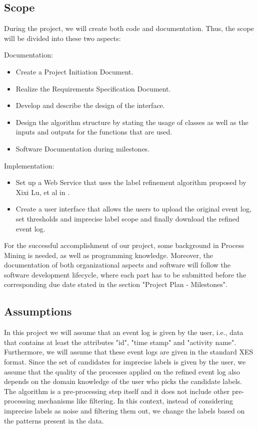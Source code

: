 \documentclass[notitlepage]{article}
\begin{document}
\begin{flushleft}
\subsection{Scope}

During the project, we will create both code and documentation. Thus, the scope will be divided into these two aspects:

Documentation: 
\begin{itemize}
	\item Create a Project Initiation Document. 
	\item Realize the Requirements Specification Document.
	\item Develop and describe the design of the interface. 
	\item Design the algorithm structure by stating the usage of classes as well as the inputs and outputs for the functions that are used.
	\item Software Documentation during milestones.
\end{itemize} 


Implementation:
\begin{itemize}
	\item Set up a Web Service that uses the label refinement algorithm proposed by Xixi Lu, et al in \cite{paper}.
	\item Create a user interface that allows the users to upload the original event log, set thresholds and imprecise label scope and finally download the refined event log.
\end{itemize}

For the successful accomplishment of our project, some background in Process Mining is needed, as well as programming knowledge.
Moreover, the documentation of both organizational aspects and software will follow the software development lifecycle, where each part has to be submitted before the corresponding due date stated in the section "Project Plan - Milestones".


\subsection{Assumptions}

In this project we will assume that an event log is given by the user, i.e., data that contains at least the attributes "id", "time stamp" and "activity name". Furthermore, we will assume that these event logs are given in the standard XES format.
Since the set of candidates for imprecise labels is given by the user, we assume that the quality of the processes applied on the refined event log also depends on the domain knowledge of the user who picks the candidate labels.
The algorithm is a pre-processing step itself and it does not include other pre-processing mechanisms like filtering.
In this context, instead of considering imprecise labels as noise and filtering them out, we change the labels based on the patterns present in the data.




\end{flushleft}
\end{document}
